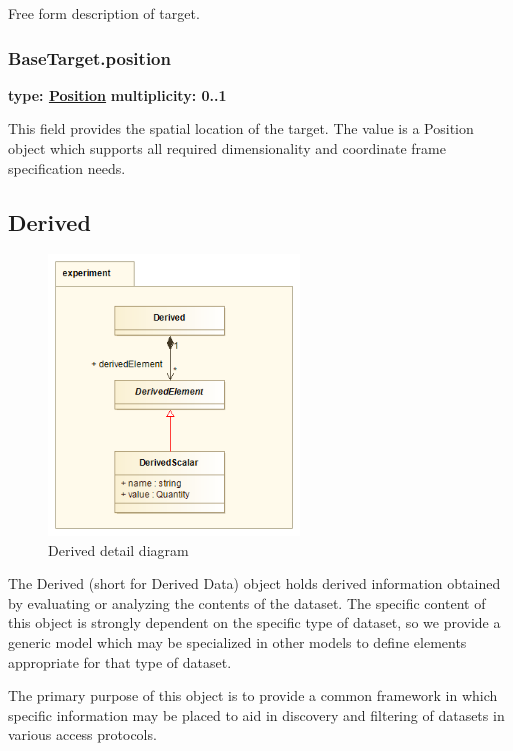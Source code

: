   Free form description of target.
  
  \subsubsection{BaseTarget.position}
  \textbf{type: \hyperref[sect:pos]{Position}} \newline
  \textbf{multiplicity: 0..1} \newline

  This field provides the spatial location of the target. The value is a
  Position object which supports all required dimensionality and coordinate
  frame specification needs.
  
\pagebreak
\subsection{Derived}
\label{sect:derived}

  \begin{figure}[h]
  \begin{center}
    \includegraphics[width=2.625in]{diagrams/Derived.png}
    \caption{ Derived detail diagram}\label{fig:derived}
  \end{center}
  \end{figure}

  The Derived (short for Derived Data) object holds derived information obtained
  by evaluating or analyzing the contents of the dataset. The specific content
  of this object is strongly dependent on the specific type of dataset, so we
  provide a generic model which may be specialized in other models to define
  elements appropriate for that type of dataset.
  
  The primary purpose of this object is to provide a common framework in which
  specific information may be placed to aid in discovery and filtering of
  datasets in various access protocols.

